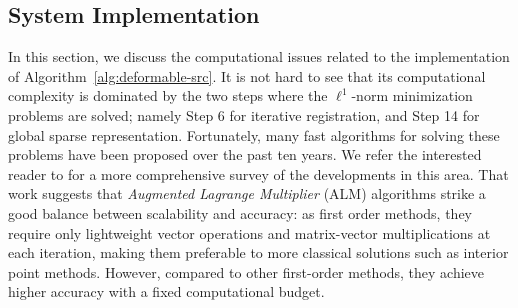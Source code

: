 \documentclass[12pt,journal,draftcls,letterpaper,onecolumn]{IEEEtran}
\begin{document}
\subsection{System Implementation}
In this section, we discuss the computational issues related to
the implementation of Algorithm~\ref{alg:deformable-src}. It is
not hard to see that its computational complexity is dominated
by the two steps where the $\ell^1$-norm minimization problems
are solved; namely Step 6 for iterative registration, and Step
14 for global sparse representation.
Fortunately, many fast algorithms for solving these problems have been proposed over the
past ten years. We refer the interested reader to \cite{YangA2010-pp} for a more comprehensive survey of the developments in this area.
That work suggests that \emph{Augmented Lagrange Multiplier}
(ALM) algorithms \cite{Bertsekas1982} strike a good balance
between scalability and accuracy: as first order methods, they
require only lightweight vector operations and matrix-vector
multiplications at each iteration, making them preferable to
more classical solutions such as interior point methods.
However, compared to other first-order methods, they achieve
higher accuracy with a fixed computational budget.
\end{document}
